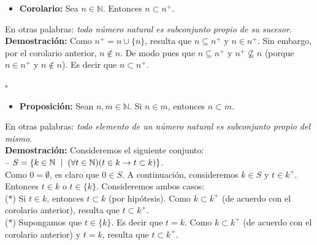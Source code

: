 \documentclass[10 pt]{article}
\begin{document}
{\begin{itemize}
    \item \Large{\textbf{Corolario:} Sea $n \in \mathbb N$. Entonces $n \subset n^+$.} \\
\end{itemize}

\Large{En otras palabras: \textit{todo número natural es subconjunto propio de su sucesor}.} \\

\Large{\textbf{Demostración:} Como $n^+=n \cup \{n\}$, resulta que $n \subseteq n^+$ y $n \in n^+$. Sin embargo, por el corolario anterior, $n \notin n$. De modo pues que $n \subseteq n^+$ y $n^+ \nsubseteq n$ (porque $n \in n^+$ y $n \notin n$). Es decir que $n \subset n^+$.} \\

\begin{flushright}
    $\square$
\end{flushright}

\begin{itemize}
    \item \Large{\textbf{Proposición:} Sean $n,m \in \mathbb N$. Si $n \in m$, entonces $n \subset m$.} \\
\end{itemize}

\Large{En otras palabras: \textit{todo elemento de un número natural es subconjunto propio del mismo}.} \\

\Large{\textbf{Demostración:} Consideremos el siguiente conjunto: \\

-- $S=\{k \in \mathbb N \hspace{0.2 cm}|\hspace{0.2 cm} (\forall t \in \mathbb N)(t \in k \rightarrow t \subset k) \}$. \\

Como $0=\emptyset$, es claro que $0 \in S$. A continuación, consideremos $k \in S$ y $t \in k^+$. Entonces $t \in k$ o $t \in \{k\}$. Consideremos ambos casos: \\

($\ast$) Si $t \in k$, entonces $t \subset k$ (por hipótesis). Como $k \subset k^+$ (de acuerdo con el corolario anterior), resulta que $t \subset k^+$. \\

($\ast$) Supongamos que $t \in \{k\}$. Es decir que $t=k$. Como $k \subset k^+$ (de acuerdo con el corolario anterior) y $t=k$, resulta que $t \subset k^+$. \\

}}
\end{document}
